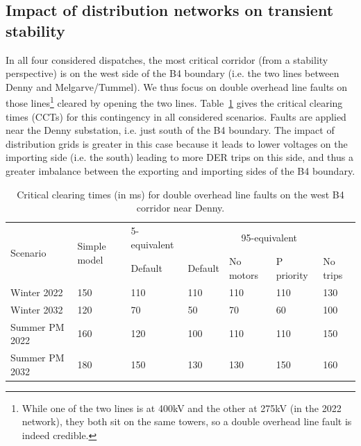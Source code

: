 \subsection{Impact of distribution networks on transient stability}
\label{sec:CIGRE_results}

In all four considered dispatches, the most critical corridor (from a stability perspective) is on the west side of the B4 boundary (i.e. the two lines between Denny and Melgarve/Tummel). We thus focus on double overhead line faults on those lines\footnote{While one of the two lines is at 400kV and the other at 275kV (in the 2022 network), they both sit on the same towers, so a double overhead line fault is indeed credible.} cleared by opening the two lines. Table~\ref{tab:CIGRE_CCT} gives the critical clearing times (CCTs) for this contingency in all considered scenarios. Faults are applied near the Denny substation, i.e. just south of the B4 boundary. The impact of distribution grids is greater in this case because it leads to lower voltages on the importing side (i.e. the south) leading to more DER trips on this side, and thus a greater imbalance between the exporting and importing sides of the B4 boundary.

\begin{table}
\centering
\caption{Critical clearing times (in ms) for double overhead line faults on the west B4 corridor near Denny.}
\label{tab:CIGRE_CCT}
\begin{tabular}{@{}lllllll@{}}
\toprule
\multirow{2}{*}{Scenario} & \multirow{2}{*}{Simple model} & 5-equivalent & \multicolumn{4}{c}{95-equivalent}                     \\ \cmidrule(lr){3-3} \cmidrule(lr){4-7}
                            &                                 & Default & Default & No motors & P priority & No trips \\ \midrule
Winter   2022             & 150                             & 110     & 110     & 110       & 110        & 130      \\
Winter   2032             & 120                             & 70      & 50      & 70        & 60         & 100      \\
Summer   PM 2022          & 160                             & 120     & 100     & 110       & 110        & 150      \\
Summer   PM 2032          & 180                             & 150     & 130     & 130       & 150        & 160      \\ \bottomrule
\end{tabular}
\end{table}

